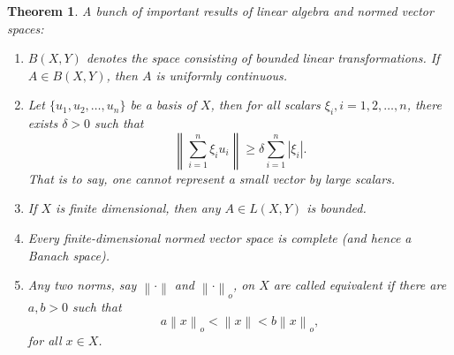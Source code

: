 \documentclass[12pt]{article}
\newtheorem{thm}{Theorem}[section]
\newcommand{\norm}[1]{\left\lVert#1\right\rVert}
\begin{document}
\begin{thm}
	A bunch of important results of linear algebra and normed vector spaces:
	\begin{enumerate}
		\item $B(X, Y)$ denotes the space consisting of bounded linear transformations. If $A \in B(X, Y)$, then $A$ is uniformly continuous.
		\item Let $\{u_1, u_2, \dots, u_n \}$ be a basis of $X$, then for all scalars $\xi_i, i=1,2,\dots, n$, there exists $\delta > 0$ such that \[\norm{\sum_{i = 1}^{n} \xi_i u_i} \geq \delta \sum_{i = 1}^{n}|\xi_i|.\] That is to say, one cannot represent a small vector by large scalars.
		\item If $X$ is finite dimensional, then any $A \in L(X, Y)$ is bounded.
		\item Every finite-dimensional normed vector space is complete (and hence a Banach space).
		\item Any two norms, say $\norm{\cdot}$ and $\norm{\cdot}_{o}$, on $X$ are called equivalent if there are $a, b > 0$ such that \[a \norm{x}_o < \norm{x} < b \norm{x}_o, \] for all $x \in X$.
	\end{enumerate}
\end{thm}
\end{document}
